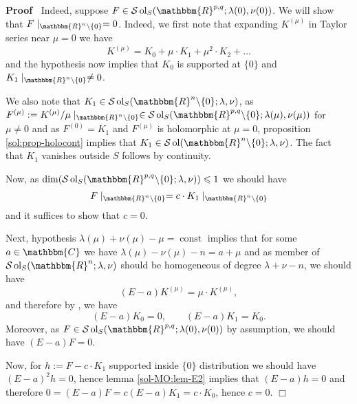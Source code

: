 \documentclass{article}
\newcommand{\assign}{:=}
\newcommand{\tmop}[1]{\ensuremath{\operatorname{#1}}}
\renewenvironment{proof}{\noindent\textbf{Proof\ }}{\hspace*{\fill}$\Box$\medskip}
\theoremstyle{remark}
\begin{document}
\begin{proof}
  Indeed, suppose $F \in \mathcal{S} \tmop{ol}_S (\mathbbm{R}^{p, q} ; \lambda
  (0), \nu (0))$. We will show that $F \mid_{\mathbbm{R}^n \backslash \{ 0
  \}} = 0$. Indeed, we first note that expanding $K^{(\mu)}$ in Taylor
  series near $\mu = 0$ we have
  \[ K^{(\mu)} = K_0 + \mu \cdot K_1 + \mu^2 \cdot K_2 + \ldots \]
  and the hypothesis now implies that $K_0$ is supported at $\{ 0 \}$ and $K_1
  \mid_{\mathbbm{R}^n \backslash \{ 0 \}} \neq 0$.
  
  We also note that $K_1 \in \mathcal{S} \tmop{ol}_S (\mathbbm{R}^n
  \backslash \{ 0 \} ; \lambda, \nu)$, as $F^{(\mu)} \assign K^{(\mu)} / \mu
  \mid_{\mathbbm{R}^n \backslash \{ 0 \}} \in \mathcal{S} \tmop{ol}_S
  (\mathbbm{R}^{p, q} \backslash \{ 0 \} ; \lambda (\mu), \nu (\mu))$ for $\mu
  \neq 0$ and as $F^{(0)} = K_1$ and $F^{(\mu)}$ is holomorphic at $\mu = 0$,
  proposition \ref{sol:prop-holocont} implies that $K_1 \in \mathcal{S}
  \tmop{ol} (\mathbbm{R}^n \backslash \{ 0 \} ; \lambda, \nu)$. The fact
  that $K_1$ vanishes outside $S$ follows by continuity.
  
  Now, as $\dim (\mathcal{S} \tmop{ol}_S (\mathbbm{R}^{p, q} \backslash \{ 0
  \} ; \lambda, \nu)) \leqslant 1$ we should have
  \[ F \mid_{\mathbbm{R}^n \backslash \{ 0 \}} = c \cdot K_1
     \mid_{\mathbbm{R}^n \backslash \{ 0 \}} \]
  and it suffices to show that $c = 0$.
  
  Next, hypothesis $\lambda (\mu) + \nu (\mu) - \mu = \tmop{const}$ implies
  that for some $a \in \mathbbm{C}$ we have $\lambda (\mu) - \nu (\mu) - n = a
  + \mu$ and as member of $\mathcal{S} \tmop{ol}_S (\mathbbm{R}^n ; \lambda,
  \nu)$ should be homogeneous of degree $\lambda + \nu - n$, we should have
  \[ (E - a) K^{(\mu)} = \mu \cdot K^{(\mu)}, \]
  and therefore by {\cite[lem. 11.10]{kobayashi2015symmetry}}, we have
  \[ (E - a) K_0 = 0, \qquad (E - a) K_1 = K_0 . \]
  Moreover, as $F \in \mathcal{S} \tmop{ol}_S (\mathbbm{R}^{p, q} ; \lambda
  (0), \nu (0))$ by assumption, we should have $(E - a) F = 0$.
  
  Now, for $h \assign F - c \cdot K_1$ supported inside $\{ 0 \}$ distribution
  we should have $(E - a)^2 h = 0$, hence lemma \ref{sol-MO:lem-E2} implies
  that $(E - a) h = 0$ and therefore $0 = (E - a) F = c (E - a) K_1 = c \cdot
  K_0$, hence $c = 0$.
\end{proof}
\end{document}
